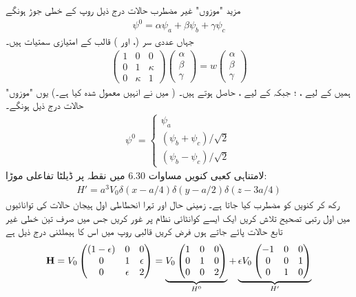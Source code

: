مزید "موزوں" غیر مضطرب حالات درج ذیل روپ کے خطی جوڑ ہونگے 
\begin{align}
\psi^0 = \alpha \psi_a + \beta \psi_b + \gamma \psi_c 
\end{align}
جہاں عددی سر (،   اور )  قالب  کے امتیازی سمتیات  ہیں۔ 
\begin{align*}
\begin{pmatrix}
1 & 0 & 0 \\
0 & 1 & \kappa \\
0 & \kappa & 1
\end{pmatrix}
\begin{pmatrix}
\alpha \\
\beta \\
\gamma
\end{pmatrix}
= w 
\begin{pmatrix}
\alpha \\
\beta \\
\gamma
\end{pmatrix}
\end{align*}
ہمیں  کے لیے  ، ؛  جبکہ   کے لیے ،
  حاصل ہوتے ہیں۔ ( میں نے انہیں  معمول شدہ    کیا ہے۔) یوں "موزوں" حالات درج ذیل ہونگے۔ 
\begin{align}
\psi^0 =
\begin{cases}
\psi_a \\
(\psi_b + \psi_c)/ \sqrt{2} \\
(\psi_b - \psi_c)/ \sqrt{2}
\end{cases}
\end{align}
لامتناہی کعبی کنویں مساوات 6.30 میں نقطہ  پر ڈیلٹا تفاعلی موڑا:
\begin{align*}
H' = a^3 V_0 \delta (x - a/4) \delta (y - a/2) \delta (z - 3a/4)
\end{align*}
 رکھ کر کنویں کو مضطرب کیا جاتا ہے۔ زمینی حال اور تہرا انحطاطی اول ہیجان حالات کی توانائیوں میں اول رتبی تصحیح تلاش کریں
ایک ایسے کوانٹائی نظام پر غور کریں جس میں صرف تین خطی غیر تابع حالات پائے جاتے ہوں فرض کریں قالبی روپ میں اس کا ہیملٹنی درج ذیل ہے
\begin{align*}
\bold{H} = V_0 
\begin{pmatrix}
(1 - \epsilon) & 0 & 0 \\
0 & 1 & \epsilon \\
0 & \epsilon & 2
\end{pmatrix}
= \underbrace{V_0 
\begin{pmatrix}
1 & 0 & 0 \\
0 & 1 & 0 \\
0 & 0 & 2
\end{pmatrix}}_{H^0} 
+ \underbrace{\epsilon V_0 
\begin{pmatrix}
-1 & 0 & 0 \\
0 & 0 & 1 \\
0 & 1 & 0
\end{pmatrix}}_{H'}
\end{align*}

